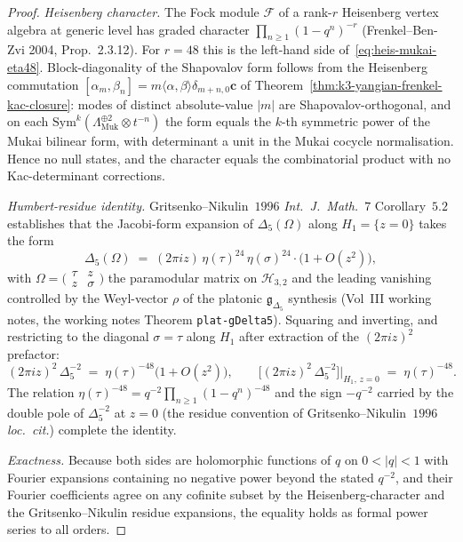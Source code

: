 \begin{proof}
\emph{Heisenberg character.} The Fock module $\mathcal F$ of a rank-$r$
Heisenberg vertex algebra at generic level has graded character
$\prod_{n\geq 1}(1-q^n)^{-r}$ (Frenkel--Ben-Zvi 2004, Prop.~2.3.12).
For $r=48$ this is the left-hand side of~\eqref{eq:heis-mukai-eta48}.
Block-diagonality of the Shapovalov form follows from the Heisenberg
commutation $[\alpha_m,\beta_n]=m\langle\alpha,\beta\rangle\delta_{m+n,0}\mathbf c$
of Theorem~\ref{thm:k3-yangian-frenkel-kac-closure}: modes of distinct
absolute-value $|m|$ are Shapovalov-orthogonal, and on each
$\mathrm{Sym}^k(\Lambda_{\mathrm{Muk}}^{\oplus 2}\otimes t^{-n})$ the
form equals the $k$-th symmetric power of the Mukai bilinear form, with
determinant a unit in the Mukai cocycle normalisation. Hence no null
states, and the character equals the combinatorial product with no
Kac-determinant corrections.

\emph{Humbert-residue identity.} Gritsenko--Nikulin~$1996$
\emph{Int.\ J.\ Math.}~$7$ Corollary~$5.2$ establishes that the
Jacobi-form expansion of $\Delta_5(\Omega)$ along $H_1=\{z=0\}$ takes
the form
\[
 \Delta_5(\Omega) \;=\; (2\pi i z)\,\eta(\tau)^{24}\,\eta(\sigma)^{24}
 \cdot\bigl(1 + O(z^2)\bigr),
\]
with $\Omega=\bigl(\begin{smallmatrix}\tau & z\\ z & \sigma\end{smallmatrix}\bigr)$
the paramodular matrix on $\mathcal H_{3,2}$ and the leading vanishing
controlled by the Weyl-vector $\rho$ of the platonic $\mathfrak{g}_{\Delta_5}$ synthesis (Vol~III working notes, the working notes Theorem \texttt{plat-gDelta5}). Squaring and inverting, and restricting to the
diagonal $\sigma = \tau$ along $H_1$ after extraction of the
$(2\pi i z)^2$ prefactor:
\[
 (2\pi i z)^2\,\Delta_5^{-2}
 \;=\; \eta(\tau)^{-48}\bigl(1+O(z^2)\bigr),
 \qquad
 \bigl[(2\pi i z)^2\,\Delta_5^{-2}\bigr]\big|_{H_1,\,z=0}
 \;=\;\eta(\tau)^{-48}.
\]
The relation $\eta(\tau)^{-48}=q^{-2}\prod_{n\geq 1}(1-q^n)^{-48}$ and
the sign $-q^{-2}$ carried by the double pole of $\Delta_5^{-2}$ at
$z=0$ (the residue convention of Gritsenko--Nikulin~$1996$
\emph{loc.\ cit.}) complete the identity.

\emph{Exactness.} Because both sides are holomorphic functions of $q$
on $0<|q|<1$ with Fourier expansions containing no negative power
beyond the stated $q^{-2}$, and their Fourier coefficients agree on any
cofinite subset by the Heisenberg-character and the Gritsenko--Nikulin
residue expansions, the equality holds as formal power series to all
orders.
\end{proof}

